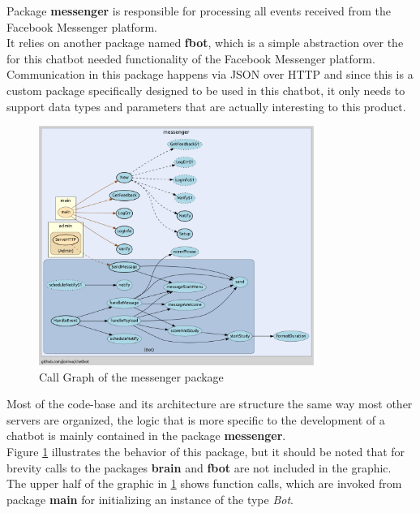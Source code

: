 Package \textbf{messenger} is responsible for processing all events received from the Facebook Messenger platform.
\\

It relies on another package named \textbf{fbot},
which is a simple abstraction over the for this chatbot needed functionality of the Facebook Messenger platform.
Communication in this package happens via JSON over HTTP and since this is a custom package
specifically designed to be used in this chatbot, it only needs to support data types and parameters that are actually interesting to this product.
\\

\begin{figure}[h]
  \centering
  \includegraphics[width=0.8\textwidth]{images/call-graph-messenger.png}
	\caption{Call Graph of the messenger package\protect\footnotemark}
	\label{fig:call-graph-messenger}
\end{figure}


Most of the code-base and its architecture are structure the same way most other servers are organized,
the logic that is more specific to the development of a chatbot is mainly contained in the package \textbf{messenger}.
\\
Figure \ref{fig:call-graph-messenger} illustrates the behavior of this package,
but it should be noted that for brevity calls to the packages \textbf{brain} and \textbf{fbot} are not included in the graphic.
\\
The upper half of the graphic in \ref{fig:call-graph-messenger} shows function calls,
which are invoked from package \textbf{main} for initializing an instance of the type \emph{Bot}.
\\

